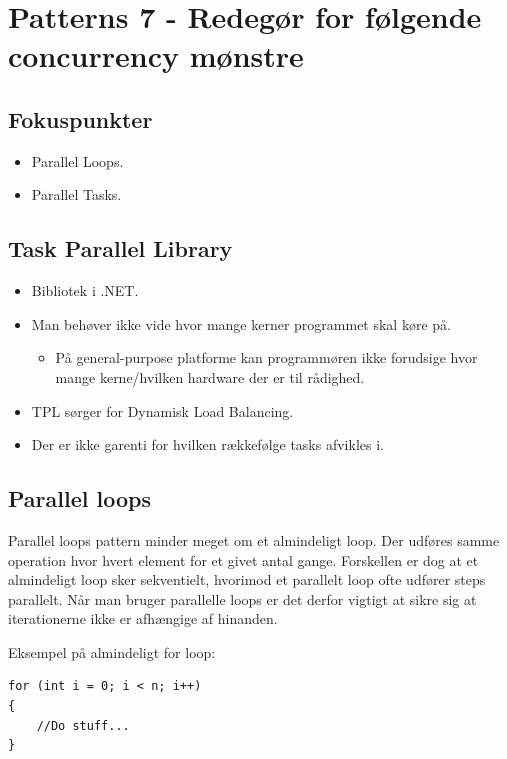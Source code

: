 \section{Patterns 7 - Redegør for følgende concurrency mønstre}

\subsection{Fokuspunkter}

\begin{itemize}
	\item Parallel Loops.
	\item Parallel Tasks.
\end{itemize}

\subsection{Task Parallel Library}
\begin{itemize}
	\item Bibliotek i .NET.
	\item Man behøver ikke vide hvor mange kerner programmet skal køre på.
	\begin{itemize}
		\item På general-purpose platforme kan programmøren ikke forudsige hvor mange kerne/hvilken hardware der er til rådighed.
	\end{itemize}
	\item TPL sørger for Dynamisk Load Balancing.
	\item Der er ikke garenti for hvilken rækkefølge tasks afvikles i. 
\end{itemize}

\subsection{Parallel loops}

Parallel loops pattern minder meget om et almindeligt loop. Der udføres samme operation hvor hvert element for et givet antal gange. Forskellen er dog at et almindeligt loop sker sekventielt, hvorimod et parallelt loop ofte udfører steps parallelt. Når man bruger parallelle loops er det derfor vigtigt at sikre sig at iterationerne ikke er afhængige af hinanden.

Eksempel på almindeligt for loop:

\begin{lstlisting}[caption=Normal for loop, label=code:normalLoop]
for (int i = 0; i < n; i++)
{
	//Do stuff...
}
\end{lstlisting}

